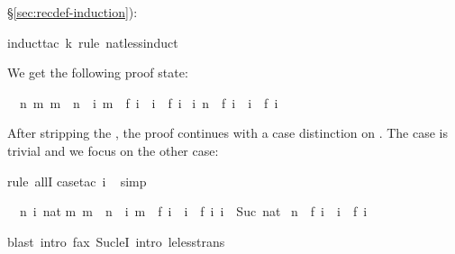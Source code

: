 \begin{isabellebody}
\begin{isamarkuptxt}
\S\ref{sec:recdef-induction}):%
\end{isamarkuptxt}%
\isamarkuptrue%
induct{\isacharunderscore}tac\ k\ rule{\isacharcolon}\ nat{\isacharunderscore}less{\isacharunderscore}induct{\isacharparenright}\isamarkupfalse%
%
\begin{isamarkuptxt}%
\noindent
We get the following proof state:
\begin{isabelle}%
\ {}{\isachardot}\ {\isasymAnd}n{\isachardot}\ {\isasymforall}m{\isachardot}\ m\ {\isacharless}\ n\ {\isasymlongrightarrow}\ {\isacharparenleft}{\isasymforall}i{\isachardot}\ m\ {\isacharequal}\ f\ i\ {\isasymlongrightarrow}\ i\ {\isasymle}\ f\ i{\isacharparenright}\ {\isasymLongrightarrow}\isanewline
{}i{\isachardot}\ n\ {\isacharequal}\ f\ i\ {\isasymlongrightarrow}\ i\ {\isasymle}\ f\ i%
\end{isabelle}
After stripping the , the proof continues with a case
distinction on . The case  is trivial and we focus on
the other case:%
\end{isamarkuptxt}%
\isamarkuptrue%
rule\ allI{\isacharparenright}\isanewline
\isamarkupfalse%
case{\isacharunderscore}tac\ i{\isacharparenright}\isanewline
\ \isamarkupfalse%
simp{\isacharparenright}\isamarkupfalse%
%
\begin{isamarkuptxt}%
\begin{isabelle}%
\ {}{\isachardot}\ {\isasymAnd}n\ i\ nat{\isachardot}\isanewline
{}m{\isachardot}\ m\ {\isacharless}\ n\ {\isasymlongrightarrow}\ {\isacharparenleft}{\isasymforall}i{\isachardot}\ m\ {\isacharequal}\ f\ i\ {\isasymlongrightarrow}\ i\ {\isasymle}\ f\ i{\isacharparenright}{\isacharsemicolon}\ i\ {\isacharequal}\ Suc\ nat{\isasymrbrakk}\isanewline
{}\ n\ {\isacharequal}\ f\ i\ {\isasymlongrightarrow}\ i\ {\isasymle}\ f\ i%
\end{isabelle}%
\end{isamarkuptxt}%
\isamarkuptrue%
blast\ intro{\isacharbang}{\isacharcolon}\ f{\isacharunderscore}ax\ Suc{\isacharunderscore}leI\ intro{\isacharcolon}\ le{\isacharunderscore}less{\isacharunderscore}trans{\isacharparenright}\isamarkupfalse%

\end{isabellebody}
